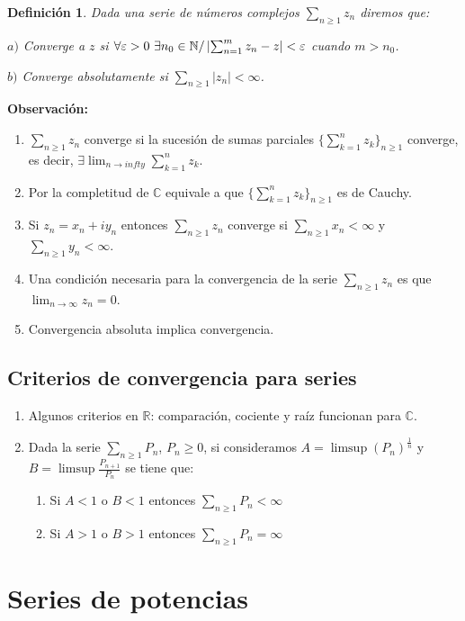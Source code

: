 \documentclass[10pt]{book}
\newtheorem{defi}{Definición}[chapter]
\newcommand{\R}{\mathbb{R}}
\newcommand{\C}{\mathbb{C}}
\newcommand{\N}{\mathbb{N}}
\begin{document}
\begin{defi}
Dada una serie de números complejos $\sum_{n\geq 1} z_n$ diremos que:

$a)$ Converge a $z$ si $\forall \varepsilon>0\ \exists n_0\in\N / \abs{\sum_{n=1}^mz_n-z} <\varepsilon$ cuando $m> n_0$.

$b)$ Converge absolutamente si $\sum_{n\geq 1} |z_n| < \infty$.
\end{defi}
\textbf{Observación:}
\begin{enumerate}
\item $\sum_{n\geq 1} z_n$ converge si la sucesión de sumas parciales $\{\sum_{k=1}^n z_k\}_{n\geq 1}$ converge, es decir, $\exists \lim_{n\to infty}\sum_{k=1}^n z_k$.
\item Por la completitud de $\C$ equivale a que $\{\sum_{k=1}^n z_k\}_{n\geq 1}$ es de Cauchy.
\item Si $z_n = x_n + iy_n$ entonces $\sum_{n\geq 1} z_n$ converge si $\sum_{n\geq 1} x_n < \infty$  y $\sum_{n\geq 1} y_n<\infty$.
\item Una condición necesaria para la convergencia de la serie $\sum_{n\geq 1} z_n$ es que $\lim_{n\to \infty} z_n = 0$.
\item Convergencia absoluta implica convergencia.
\end{enumerate}

\subsection{Criterios de convergencia para series}

\begin{enumerate}
\item Algunos criterios en $\R$: comparación, cociente y raíz funcionan para $\C$.
\item Dada la serie $\sum_{n\geq 1} P_n$, $P_n\geq 0$, si consideramos $A = \limsup(P_n)^{\frac{1}{n}}$ y $B = \limsup\frac{P_{n+1}}{P_n}$ se tiene que:
	\begin{enumerate}
	\item Si $A <1$ o $B<1$ entonces $\sum_{n\geq 1} P_n< \infty$
	\item Si $A >1$ o $B>1$ entonces $\sum_{n\geq 1} P_n= \infty$
	\end{enumerate}
\end{enumerate}


\section{Series de potencias}
\end{document}
